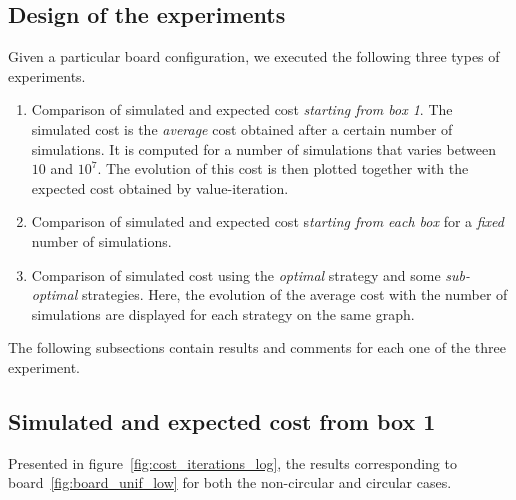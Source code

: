 \subsection{Design of the experiments}
Given a particular board configuration, we executed the following three types of experiments.
\begin{enumerate}
	\item Comparison of simulated and expected cost \emph{starting from box 1}.
	The simulated cost is the \emph{average} cost obtained after a certain number of simulations.
	It is computed for a number of simulations that varies between $10$ and $10^7$. 
	The evolution of this cost is then plotted together with the expected cost obtained by value-iteration.
	\item Comparison of simulated and expected cost s\emph{tarting from each box}
  for a \emph{fixed} number of simulations.
	\item Comparison of simulated cost using the \emph{optimal} strategy
  and some \emph{sub-optimal} strategies. 
	Here, the evolution of the average cost with the number of simulations are displayed for each strategy on the same graph.
\end{enumerate}
The following subsections contain results and comments for each one of the three experiment.

\subsection{Simulated and expected cost from box 1}
Presented in figure~\ref{fig:cost_iterations_log},
the results corresponding to board~\ref{fig:board_unif_low} 
for both the non-circular and circular cases.

